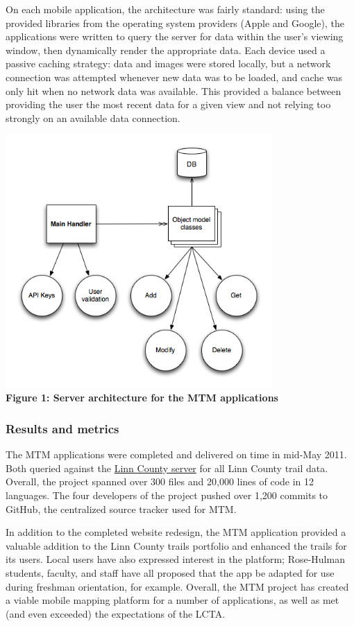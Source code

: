 \documentclass{article}
\begin{document}
On each mobile application, the architecture was fairly standard: using the provided libraries from the operating system providers (Apple and Google), the applications were written to query the server for data within the user's viewing window, then dynamically render the appropriate data. Each device used a passive caching strategy: data and images were stored locally, but a network connection was attempted whenever new data was to be loaded, and cache was only hit when no network data was available. This provided a balance between providing the user the most recent data for a given view and not relying too strongly on an available data connection.


\begin{center}
\includegraphics[width=4in]{../ArchitectureViews/server-components.png} \\
\textbf{Figure 1: Server architecture for the MTM applications}
\end{center}

\subsubsection*{Results and metrics}
The MTM applications were completed and delivered on time in mid-May 2011. Both queried against the \href{http://mtm.linncountytrails.org}{Linn County server} for all Linn County trail data. Overall, the project spanned over 300 files and 20,000 lines of code in 12 languages. The four developers of the project pushed over 1,200 commits to GitHub, the centralized source tracker used for MTM.

In addition to the completed website redesign, the MTM application provided a valuable addition to the Linn County trails portfolio and enhanced the trails for its users. Local users have also expressed interest in the platform; Rose-Hulman students, faculty, and staff have all proposed that the app be adapted for use during freshman orientation, for example. Overall, the MTM project has created a viable mobile mapping platform for a number of applications, as well as met (and even exceeded) the expectations of the LCTA.
\end{document}
